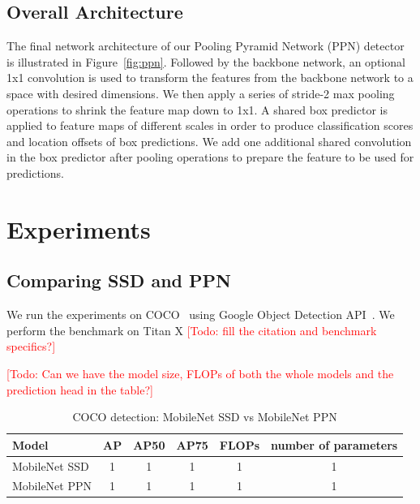 \documentclass[10pt,twocolumn,letterpaper]{article}
\newcommand{\todo}[1]{\textcolor{red}{[Todo: #1]}}
\begin{document}

\subsection{Overall Architecture}


The final network architecture of our Pooling Pyramid
Network (PPN) detector is illustrated in
Figure~\ref{fig:ppn}.  Followed by the backbone network, an
optional 1x1 convolution is used to transform the features
from the backbone network to a space with desired
dimensions.  We then apply a series of stride-2 max pooling
operations to shrink the feature map down to 1x1.  A shared
box predictor is applied to feature maps of different scales
in order to produce classification scores and location
offsets of box predictions.  We add one additional shared
convolution in the box predictor after pooling operations to
prepare the feature to be used for predictions.


\section{Experiments}

\subsection{Comparing SSD and PPN}

We run the experiments on COCO~\cite{coco} using Google
Object Detection API~\cite{api}. We perform the benchmark on
Titan X \todo{fill the citation and benchmark specifics?}

\todo{Can we have the model size, FLOPs of both the whole
models and the prediction head in the table?}


\begin{table}[t]
\begin{center}
\begin{tabular}{l|c|c|c|c|c}
Model & AP & AP50 & AP75 & FLOPs & number of parameters \\
\hline
\hline
MobileNet SSD & 1 & 1 & 1 & 1 & 1 \\
\hline
MobileNet PPN & 1 & 1 & 1 & 1 & 1 \\
\end{tabular}
\end{center}
\caption{COCO detection: MobileNet SSD vs MobileNet PPN}
\end{table}


{\small


}
\end{document}
